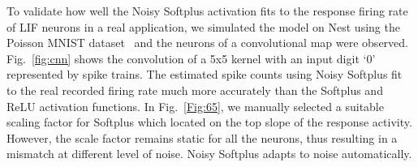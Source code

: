 	To validate how well the Noisy Softplus activation fits to the response firing rate of LIF neurons in a real application, we simulated the model on Nest using the Poisson MNIST dataset~\cite{liu2016bench} and the neurons of a convolutional map were observed.
	Fig.~\ref{fig:cnn} shows the convolution of a 5x5 kernel with an input digit `0' represented by spike trains.
	The estimated spike counts using Noisy Softplus fit to the real recorded firing rate much more accurately than the Softplus and ReLU activation functions.
	In Fig.~\ref*{Fig:65}, we manually selected a suitable scaling factor for Softplus which located on the top slope of the response activity.
	However, the scale factor remains static for all the neurons, thus resulting in a mismatch at different level of noise.
	Noisy Softplus adapts to noise automatically.
	

	
	
